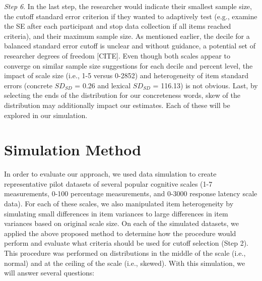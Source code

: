 \documentclass[
  man]{apa7}
\begin{document}
\emph{Step 6}. In the last step, the researcher would indicate their smallest sample size, the cutoff standard error criterion if they wanted to adaptively test (e.g., examine the SE after each participant and stop data collection if all items reached criteria), and their maximum sample size. As mentioned earlier, the decile for a balanced standard error cutoff is unclear and without guidance, a potential set of researcher degrees of freedom {[}CITE{]}. Even though both scales appear to converge on similar sample size suggestions for each decile and percent level, the impact of scale size (i.e., 1-5 versus 0-2852) and heterogeneity of item standard errors (concrete \(SD_{SD}\) = 0.26 and lexical \(SD_{SD}\) = 116.13) is not obvious. Last, by selecting the ends of the distribution for our concreteness words, skew of the distribution may additionally impact our estimates. Each of these will be explored in our simulation.

\hypertarget{simulation-method}{%
\section{Simulation Method}\label{simulation-method}}

In order to evaluate our approach, we used data simulation to create representative pilot datasets of several popular cognitive scales (1-7 measurements, 0-100 percentage measurements, and 0-3000 response latency scale data). For each of these scales, we also manipulated item heterogeneity by simulating small differences in item variances to large differences in item variances based on original scale size. On each of the simulated datasets, we applied the above proposed method to determine how the procedure would perform and evaluate what criteria should be used for cutoff selection (Step 2). This procedure was performed on distributions in the middle of the scale (i.e., normal) and at the ceiling of the scale (i.e., skewed). With this simulation, we will answer several questions:
\end{document}
